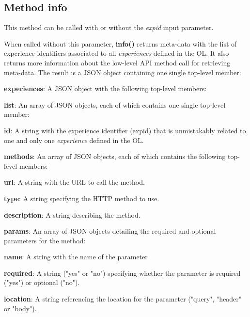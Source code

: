 \subsection{Method info}
This method can be called with or without the \textit{expid} input parameter.

When called without this parameter, \textbf{info()} returns meta-data with the list of experience identifiers associated to all \textit{experiences} defined in the OL. It also returns more information about the low-level API method call for retrieving meta-data. The result is a JSON object containing one single top-level member:

\begin{myEnumerate}
    \item \textbf{experiences}: A JSON object with the following top-level members:
    \begin{myEnumerate}
        \item \textbf{list}: An array of JSON objects, each of which contains one single top-level member:
        \begin{myEnumerate}
            \item \textbf{id}: A string with the experience identifier (expid) that is unmistakably related to one and only one \textit{experience} defined in the OL.
        \end{myEnumerate}
        \item \textbf{methods}: An array of JSON objects, each of which contains the following top-level members:
        \begin{myEnumerate}
            \item \textbf{url}: A string with the URL to call the method.
            \item \textbf{type}: A string specifying the HTTP method to use.
            \item \textbf{description}: A string describing the method.
            \item \textbf{params}: An array of JSON objects detailing the required and optional parameters for the method:
            \begin{myEnumerate}
                \item \textbf{name}: A string with the name of the parameter
                \item \textbf{required}: A string ("yes" or "no") specifying whether the parameter is required ("yes") or optional ("no").
                \item \textbf{location}: A string referencing the location for the parameter ("query", "header" or "body").

\end{myEnumerate}
\end{myEnumerate}
\end{myEnumerate}
\end{myEnumerate}
